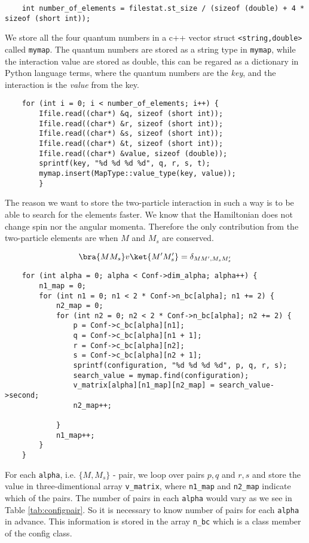 \begin{lstlisting}
    int number_of_elements = filestat.st_size / (sizeof (double) + 4 * sizeof (short int));
\end{lstlisting}
%
We store all the four quantum numbers in a c++ vector struct \texttt{<string,double>} called \texttt{mymap}. The quantum numbers are stored as a string type in \texttt{mymap}, while the interaction value are stored as double, this can be regared as a dictionary in Python language terms, where the quantum numbers are the \emph{key}, and the interaction is the \emph{value} from the key.  
\begin{lstlisting}
    for (int i = 0; i < number_of_elements; i++) {
        Ifile.read((char*) &q, sizeof (short int));
        Ifile.read((char*) &r, sizeof (short int));
        Ifile.read((char*) &s, sizeof (short int));
        Ifile.read((char*) &t, sizeof (short int));
        Ifile.read((char*) &value, sizeof (double));
        sprintf(key, "%d %d %d %d", q, r, s, t);
        mymap.insert(MapType::value_type(key, value));
        }
\end{lstlisting}
%
The reason we want to store the two-particle interaction in such a way is to be able to search for the elements faster. We know that the Hamiltonian does not change spin nor the angular momenta. Therefore the only contribution from the two-particle elements are when $M$ and $M_s$ are conserved. 

\begin{equation}
  \bra{M M_s}v\ket{M' M_s'} = \delta_{MM',M_s M_s'}
\end{equation}
%
\begin{lstlisting}
    for (int alpha = 0; alpha < Conf->dim_alpha; alpha++) {
        n1_map = 0;
        for (int n1 = 0; n1 < 2 * Conf->n_bc[alpha]; n1 += 2) {
            n2_map = 0;
            for (int n2 = 0; n2 < 2 * Conf->n_bc[alpha]; n2 += 2) {
            	p = Conf->c_bc[alpha][n1];
            	q = Conf->c_bc[alpha][n1 + 1];
            	r = Conf->c_bc[alpha][n2];
            	s = Conf->c_bc[alpha][n2 + 1];
                sprintf(configuration, "%d %d %d %d", p, q, r, s);
                search_value = mymap.find(configuration);
                v_matrix[alpha][n1_map][n2_map] = search_value->second;
                n2_map++;

            }
            n1_map++;
        }
    }
\end{lstlisting}
%
For each \texttt{alpha}, i.e. $\{M, M_s\}$ - pair, we loop over pairs $p,q$ and $r,s$ and store the value in three-dimentional array \texttt{v\_matrix}, where \texttt{n1\_map} and \texttt{n2\_map} indicate which of the pairs. The number of pairs in each \texttt{alpha} would vary as we see in Table \ref{tab:configpair}. So it is  necessary to know number of pairs for each \texttt{alpha} in advance. This information is stored in the array \texttt{n\_bc} which is a class member of the config class. 

